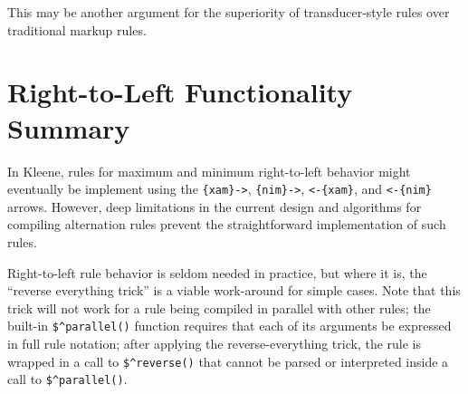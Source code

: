 \noindent
This may be another argument for the superiority of transducer-style rules over
traditional markup rules.


\section{Right-to-Left Functionality Summary}

In Kleene, rules for maximum and minimum right-to-left behavior might
eventually be implement using the \texttt{\{xam\}->}, \texttt{\{nim\}->}, \texttt{<-\{xam\}}, and
\mbox{\texttt{<-\{nim\}}} arrows.  However,
deep limitations in the current design and algorithms for compiling alternation
rules prevent the straightforward implementation of such rules.

Right-to-left rule behavior is seldom needed in practice, but where it is, the
``reverse everything trick'' is a viable work-around for simple cases.  Note that
this trick will not work for a rule being compiled in parallel with
other rules; the built-in \verb!$^parallel()! function requires that each of
its arguments be expressed in full rule notation; after applying the
reverse-everything trick, the rule is wrapped in a call to \verb!$^reverse()!
that cannot be parsed or interpreted inside a call to \verb!$^parallel()!.

